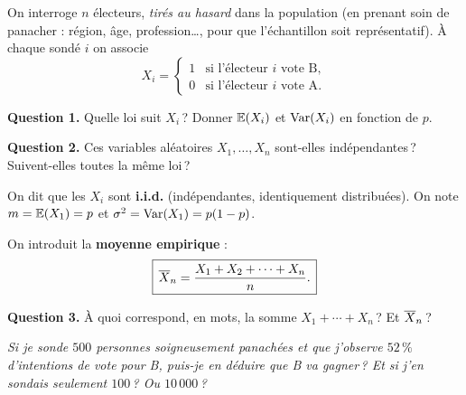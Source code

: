 \medskip

On interroge $n$ électeurs, \emph{tirés au hasard} dans la
population (en prenant soin de \og panacher \fg{} : région, âge,
profession\dots, pour que l'échantillon soit représentatif). À
chaque sondé $i$ on associe
\[
  X_i=\begin{cases}1 & \text{si l'électeur } i \text{ vote B},\\
  0 & \text{si l'électeur } i \text{ vote A}.\end{cases}
\]

\textbf{Question 1.} Quelle loi suit $X_i$\,? Donner $\mathbb{E}(X_i)$ et
$\operatorname{Var}(X_i)$ en fonction de $p$.


\textbf{Question 2.} Ces variables aléatoires $X_1,\dots,X_n$
sont-elles indépendantes\,? Suivent-elles toutes la même loi\,?


On dit que les $X_i$ sont \textbf{i.i.d.} (indépendantes,
identiquement distribuées). On note $m=\mathbb{E}(X_1)=p$ et
$\sigma^2=\operatorname{Var}(X_1)=p(1-p)$.

\medskip

On introduit la \textbf{moyenne empirique} :
\[
  \boxed{\,\overline{X}_n = \dfrac{X_1 + X_2 + \cdots + X_n}{n}.\,}
\]

\textbf{Question 3.} À quoi correspond, en mots, la somme
$X_1+\cdots+X_n$\,? Et $\overline{X}_n$\,?


\begin{center}
\begin{mdframed}[backgroundcolor=ThemeLight, linecolor=Theme,
  linewidth=1.5pt, innertopmargin=10pt, innerbottommargin=10pt]
\centering\large\itshape
Si je sonde \textbf{$500$} personnes soigneusement panachées et que
j'observe $52\,\%$ d'intentions de vote pour B, puis-je en déduire
que B va gagner\,?\newline
Et si j'en sondais seulement $100$\,? Ou $10\,000$\,?
\end{mdframed}
\end{center}

